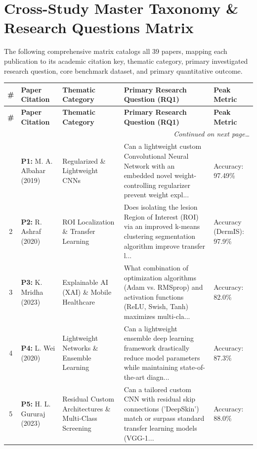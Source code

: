 \section{Cross-Study Master Taxonomy \& Research Questions Matrix}
\label{sec:matrix}
The following comprehensive matrix catalogs all 39 papers, mapping each publication to its academic citation key, thematic category, primary investigated research question, core benchmark dataset, and primary quantitative outcome.
\vspace{0.8em}
\begin{small}
\begin{longtable}{|c|p{3.2cm}|p{2.8cm}|p{5.2cm}|p{2.4cm}|}
\hline
\textbf{\#} & \textbf{Paper Citation} & \textbf{Thematic Category} & \textbf{Primary Research Question (RQ1)} & \textbf{Peak Metric} \\
\hline
\endfirsthead
\hline
\textbf{\#} & \textbf{Paper Citation} & \textbf{Thematic Category} & \textbf{Primary Research Question (RQ1)} & \textbf{Peak Metric} \\
\hline
\endhead
\hline \multicolumn{5}{|r|}{\textit{Continued on next page\dots}} \\ \hline
\endfoot
\hline
\endlastfoot
1 & \textbf{P1:} M. A. Albahar (2019)~\cite{8669763} & Regularized \& Lightweight CNNs & Can a lightweight custom Convolutional Neural Network with an embedded novel weight-controlling regularizer prevent weight expl... & Accuracy: 97.49\% \\ \hline
2 & \textbf{P2:} R. Ashraf (2020)~\cite{9160933} & ROI Localization \& Transfer Learning & Does isolating the lesion Region of Interest (ROI) via an improved k-means clustering segmentation algorithm improve transfer l... & Accuracy (DermIS): 97.9\% \\ \hline
3 & \textbf{P3:} K. Mridha (2023)~\cite{10107401} & Explainable AI (XAI) \& Mobile Healthcare & What combination of optimization algorithms (Adam vs. RMSprop) and activation functions (ReLU, Swish, Tanh) maximizes multi-cla... & Accuracy: 82.0\% \\ \hline
4 & \textbf{P4:} L. Wei (2020)~\cite{9099799} & Lightweight Networks \& Ensemble Learning & Can a lightweight ensemble deep learning framework drastically reduce model parameters while maintaining state-of-the-art diagn... & Accuracy: 87.3\% \\ \hline
5 & \textbf{P5:} H. L. Gururaj (2023)~\cite{10122533} & Residual Custom Architectures \& Multi-Class Screening & Can a tailored custom CNN with residual skip connections ('DeepSkin') match or surpass standard transfer learning models (VGG-1... & Accuracy: 88.0\% \\ \hline

\end{longtable}
\end{small}
